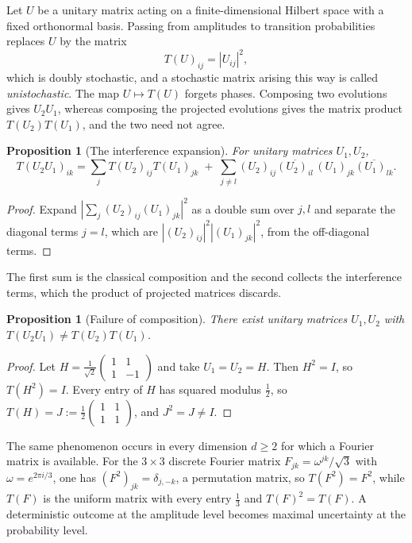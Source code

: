 \documentclass[11pt,oneside]{book}
\newtheorem{proposition}[theorem]{Proposition}
\theoremstyle{definition}
\theoremstyle{remark}
\begin{document}
Let $U$ be a unitary matrix acting on a finite-dimensional Hilbert space with a fixed orthonormal basis. Passing from amplitudes to transition probabilities replaces $U$ by the matrix
\[
T(U)_{ij}=|U_{ij}|^2,
\]
which is doubly stochastic, and a stochastic matrix arising this way is called \emph{unistochastic}. The map $U\mapsto T(U)$ forgets phases. Composing two evolutions gives $U_2U_1$, whereas composing the projected evolutions gives the matrix product $T(U_2)T(U_1)$, and the two need not agree.

\begin{proposition}[The interference expansion]\label{prop:interference}
For unitary matrices $U_1,U_2$,
\[
T(U_2U_1)_{ik}=\sum_j T(U_2)_{ij}T(U_1)_{jk}\;+\;\sum_{j\neq l}(U_2)_{ij}\overline{(U_2)_{il}}\,(U_1)_{jk}\overline{(U_1)_{lk}} .
\]
\end{proposition}

\begin{proof}
Expand $|\sum_j (U_2)_{ij}(U_1)_{jk}|^2$ as a double sum over $j,l$ and separate the diagonal terms $j=l$, which are $|(U_2)_{ij}|^2|(U_1)_{jk}|^2$, from the off-diagonal terms.
\end{proof}

The first sum is the classical composition and the second collects the interference terms, which the product of projected matrices discards.

\begin{proposition}[Failure of composition]\label{prop:hadamard}
There exist unitary matrices $U_1,U_2$ with $T(U_2U_1)\neq T(U_2)T(U_1)$.
\end{proposition}

\begin{proof}
Let $H=\tfrac1{\sqrt2}\begin{pmatrix}1&1\\1&-1\end{pmatrix}$ and take $U_1=U_2=H$. Then $H^2=I$, so $T(H^2)=I$. Every entry of $H$ has squared modulus $\tfrac12$, so $T(H)=J:=\tfrac12\begin{pmatrix}1&1\\1&1\end{pmatrix}$, and $J^2=J\neq I$.
\end{proof}

The same phenomenon occurs in every dimension $d\ge2$ for which a Fourier matrix is available. For the $3\times3$ discrete Fourier matrix $F_{jk}=\omega^{jk}/\sqrt3$ with $\omega=e^{2\pi i/3}$, one has $(F^2)_{jk}=\delta_{j,-k}$, a permutation matrix, so $T(F^2)=F^2$, while $T(F)$ is the uniform matrix with every entry $\tfrac13$ and $T(F)^2=T(F)$. A deterministic outcome at the amplitude level becomes maximal uncertainty at the probability level.
\end{document}
